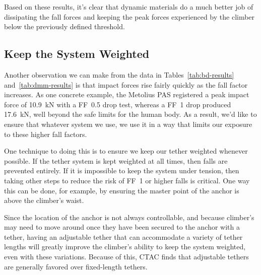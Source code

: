 \documentclass[nonacm,acmtog]{acmart}
\begin{document}
   Based on these results, it's clear that dynamic materials do a much better
   job of dissipating the fall forces and keeping the peak forces experienced by
   the climber below the previously defined threshold.

%
%

\subsection{Keep the System Weighted}

   Another observation we can make from the data in Tables~\ref{tab:bd-results}
   and~\ref{tab:dmm-results} is that impact forces rise fairly quickly as the
   fall factor increases.  As one concrete example, the Metolius PAS registered
   a peak impact force of 10.9~kN with a FF~0.5 drop test, whereas a FF~1 drop
   produced 17.6~kN, well beyond the safe limits for the human body.  As a
   result, we'd like to ensure that whatever system we use, we use it in a way
   that limits our exposure to these higher fall factors.

   One technique to doing this is to ensure we keep our tether weighted whenever
   possible.  If the tether system is kept weighted at all times, then falls
   are prevented entirely.  If it is impossible to keep the system under
   tension, then taking other steps to reduce the risk of FF~1 or higher falls
   is critical.  One way this can be done, for example, by ensuring the master
   point of the anchor is above the climber's waist.

   Since the location of the anchor is not always controllable, and because
   climber's may need to move around once they have been secured to the anchor
   with a tether, having an adjustable tether that can accommodate a variety of
   tether lengths will greatly improve the climber's ability to keep the system
   weighted, even with these variations.  Because of this, CTAC finds that
   adjustable tethers are generally favored over fixed-length tethers.
\end{document}
